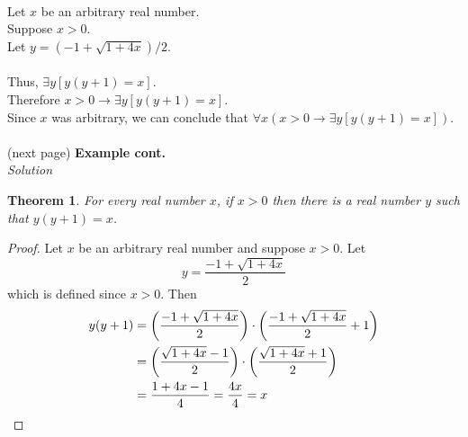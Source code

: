 \documentclass{report}
\newtheorem*{theorem}{Theorem}
\theoremstyle{definition}
\begin{document}
\vspace{1mm}\\
\indent Let $x$ be an arbitrary real number.\\
\indent\indent Suppose $x>0$.\\
\indent\indent\indent Let $y=(-1+\sqrt{1+4x})/2$.\\
\indent\indent\indent\indent [Proof of $y(y+1)=x$ goes here.]\\
\indent\indent\indent Thus, $\exists y[y(y+1)=x]$.\\
\indent\indent Therefore $x>0\to\exists y[y(y+1)=x]$.\\
\indent Since $x$ was arbitrary, we can conclude that $\forall x(x>0\to\exists y[y(y+1)=x])$.\\
\vspace{1mm}\\
(next page)\newpage
\noindent\textbf{Example cont.}\\
\textit{Solution}
\begin{theorem}
For every real number $x$, if $x>0$ then there is a real number $y$ such that $y(y+1)=x$.
\end{theorem}
\begin{proof}
Let $x$ be an arbitrary real number and suppose $x>0$. Let 
\begin{equation*}
y=\frac{-1+\sqrt{1+4x}}{2}
\end{equation*}
which is defined since $x>0$. Then
\begin{align*}
y(y+1)&=\left(\frac{-1+\sqrt{1+4x}}{2}\right)\cdot\left(\frac{-1+\sqrt{1+4x}}{2}+1\right)\\
&=\left(\frac{\sqrt{1+4x}-1}{2}\right)\cdot\left(\frac{\sqrt{1+4x}+1}{2}\right)\\
&=\frac{1+4x-1}{4}=\frac{4x}{4}=x\qedhere
\end{align*}
\end{proof}
\newpage
\end{document}
